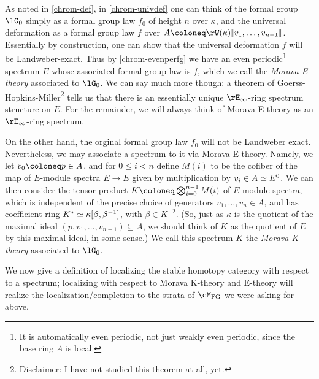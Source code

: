 \begin{nothing}
  \label{chrom-moravathy}
  As noted in \cref{chrom-def}, in \cref{chrom-univdef} one can think
  of the formal group $\lG_0$ simply as a formal group law $f_0$ of
  height $n$ over $\kappa$, and the universal deformation as a formal
  group law $f$ over
  $A \ce \rW(\kappa) \ldb v_1, \ldots, v_{n-1} \rdb$.  Essentially by
  construction, one can show that the universal deformation $f$ will
  be Landweber-exact. Thus by \cref{chrom-evenperfg} we have an even
  periodic\footnote{It is automatically even periodic, not just weakly
    even periodic, since the base ring $A$ is local.} spectrum $E$
  whose associated formal group law is $f$, which we call the
  \emph{Morava E-theory} associated to $\lG_0$. We can say much more
  though: a theorem of Goerss-Hopkins-Miller\footnote{Disclaimer: I
    have not studied this theorem at all, yet.} tells us that there is
  an essentially unique $\rE_\infty$-ring spectrum structure on
  $E$. For the remainder, we will always think of Morava E-theory as
  an $\rE_\infty$-ring spectrum.

  On the other hand, the orginal formal group law $f_0$ will not be
  Landweber exact. Nevertheless, we may associate a spectrum to it via
  Morava E-theory. Namely, we let $v_0 \ce p \in A$, and for
  $0 \le i < n$ define $M(i)$ to be the cofiber of the map of
  $E$-module spectra $E \to E$ given by multiplication by
  $v_i \in A \simeq E^0$. We can then consider the tensor product
  $K \ce \bigotimes_{i=0}^{n-1} M(i)$ of $E$-module spectra, which is
  independent of the precise choice of generators
  $v_1,\ldots,v_n \in A$, and has coefficient ring
  $K^* \simeq \kappa[\beta,\beta^{-1}]$, with $\beta \in K^{-2}$. (So,
  just as $\kappa$ is the quotient of the maximal ideal
  $(p,v_1,\ldots,v_{n-1}) \subseteq A$, we should think of $K$ as the
  quotient of $E$ by this maximal ideal, in some sense.) We call this
  spectrum $K$ the \emph{Morava K-theory} associated to $\lG_0$.
\end{nothing}

We now give a definition of localizing the stable homotopy category
with respect to a spectrum; localizing with respect to Morava K-theory
and E-theory will realize the localization/completion to the strata of
$\cM_\FG$ we were asking for above.

